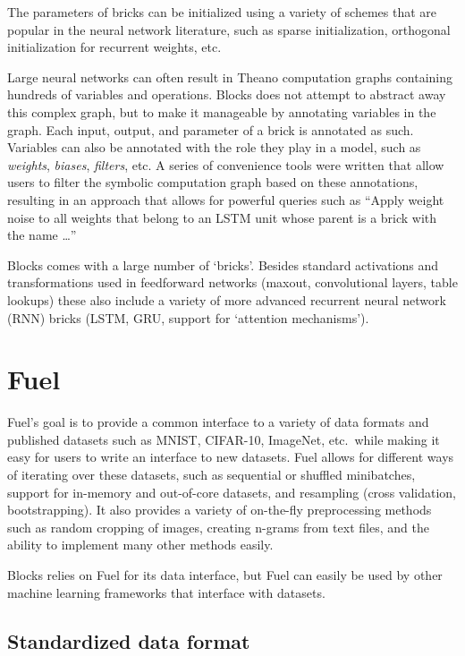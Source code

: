 \documentclass[twoside,11pt]{article}
\begin{document}
The parameters of bricks can be initialized using a variety of schemes that are
popular in the neural network literature, such as sparse initialization,
orthogonal initialization for recurrent weights, etc.

Large neural networks can often result in Theano computation graphs containing
hundreds of variables and operations. Blocks does not attempt to abstract away
this complex graph, but to make it manageable by annotating variables in the
graph. Each input, output, and parameter of a brick is annotated as such.
Variables can also be annotated with the role they play in a model, such as
\emph{weights}, \emph{biases}, \emph{filters}, etc. A series of convenience
tools were written that allow users to filter the symbolic computation graph
based on these annotations, resulting in an approach that allows for powerful
queries such as ``Apply weight noise to all weights that belong to an LSTM
unit whose parent is a brick with the name \ldots''

Blocks comes with a large number of `bricks'. Besides standard activations and
transformations used in feedforward networks (maxout, convolutional layers,
table lookups) these also include a variety of more advanced recurrent neural
network (RNN) bricks (LSTM, GRU, support for `attention mechanisms').

\section{Fuel}

Fuel's goal is to provide a common interface to a variety of data formats and
published datasets such as MNIST, CIFAR-10, ImageNet, etc.\ while making it easy
for users to write an interface to new datasets. Fuel allows for different ways
of iterating over these datasets, such as sequential or shuffled minibatches,
support for in-memory and out-of-core datasets, and resampling (cross
validation, bootstrapping). It also provides a variety of on-the-fly
preprocessing methods such as random cropping of images, creating n-grams from
text files, and the ability to implement many other methods easily.

Blocks relies on Fuel for its data interface, but Fuel can easily be used by
other machine learning frameworks that interface with datasets.

\subsection{Standardized data format}
\end{document}
